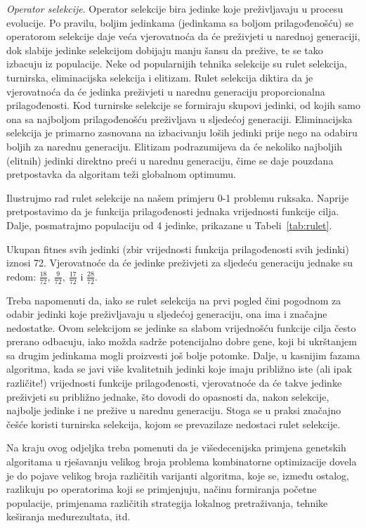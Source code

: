 \documentclass[a4paper, utf8, 11pt, colorlinks]{book}
\theoremstyle{definition}
\begin{document}
\emph{Operator selekcije}.  Operator selekcije bira jedinke koje preživljavaju u procesu evolucije. Po pravilu, boljim jedinkama (jedinkama sa boljom prilagođenošću) se operatorom selekcije daje veća vjerovatnoća da će preživjeti u narednoj generaciji, dok  slabije jedinke selekcijom dobijaju manju šansu da prežive, te se tako izbacuju iz populacije. Neke od popularnijih tehnika selekcije su rulet selekcija, turnirska, eliminacijska selekcija i elitizam.
Rulet selekcija diktira da je vjerovatnoća da će jedinka preživjeti u narednu generaciju proporcionalna prilagođenosti. Kod turnirske selekcije se formiraju skupovi jedinki, od kojih samo ona sa najboljom prilagođenošću preživljava u sljedećoj generaciji. Eliminacijska selekcija je primarno zasnovana na izbacivanju loših jedinki prije nego na odabiru boljih za narednu generaciju. Elitizam podrazumijeva da će nekoliko najboljih (elitnih) jedinki direktno preći u narednu generaciju, čime se daje pouzdana pretpostavka da  algoritam teži globalnom optimumu.

Ilustrujmo rad rulet selekcije na našem primjeru 0-1 problemu ruksaka. Naprije pretpostavimo da je funkcija prilagođenosti jednaka vrijednosti funkcije cilja. Dalje, posmatrajmo populaciju od 4 jedinke, prikazane u Tabeli~\ref{tab:rulet}.

Ukupan fitnes svih jedinki (zbir vrijednosti funkcija prilagođenosti svih jedinki) iznosi 72. Vjerovatnoće da će jedinke preživjeti za sljedeću generaciju jednake su redom: $\frac{18}{72},\ \frac{9}{72},\ \frac{17}{72}$ i $\frac{28}{72}$. 

Treba napomenuti da, iako se rulet selekcija na prvi pogled čini pogodnom za odabir jedinki koje preživljavaju u sljedećoj generaciju, ona ima i značajne nedostatke. Ovom selekcijom se jedinke sa slabom vrijednošću funkcije cilja često prerano odbacuju, iako možda sadrže potencijalno dobre gene, koji bi ukrštanjem sa drugim jedinkama mogli proizvesti još bolje potomke. Dalje, u kasnijim fazama algoritma, kada se javi više kvalitetnih jedinki koje imaju približno iste (ali ipak različite!) vrijednosti funkcije prilagođenosti, vjerovatnoće da će takve jedinke preživjeti su približno jednake, što dovodi do opasnosti da, nakon selekcije, najbolje jedinke i ne prežive u narednu generaciju. Stoga se u praksi značajno češće koristi turnirska selekcija, kojom se prevazilaze nedostaci rulet selekcije.


Na kraju ovog odjeljka treba pomenuti da je višedecenijska primjena genetskih algoritama u rješavanju velikog broja problema kombinatorne optimizacije dovela je do pojave velikog broja različitih varijanti algoritma, koje se, između ostalog, razlikuju po operatorima koji se primjenjuju, načinu formiranja početne populacije, primjenama različitih strategija lokalnog pretraživanja, tehnike keširanja međurezultata, itd. 
\end{document}
